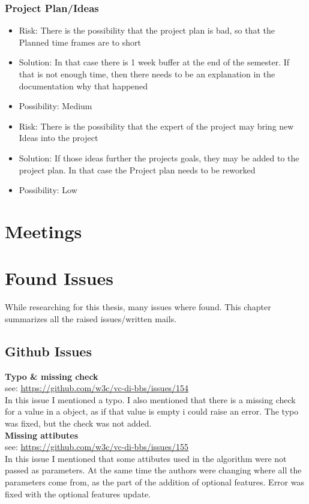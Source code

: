 \documentclass[
	a4paper               %
	,BCOR=0mm            %
	,bibliography=totoc   %
	,listof=totoc         %
	,monolingual
	,twoside=false
]{bfhthesis}              %
\begin{document}
\subsection{Project Plan/Ideas}
\begin{itemize}
	\item Risk: There is the possibility that the project plan is bad, so that the Planned time frames are to short
	\item Solution: In that case there is 1 week buffer at the end of the semester. If that is not enough time, then there needs to be an explanation in the documentation why that happened
	\item Possibility: Medium
\end{itemize}
\begin{itemize}
	\item Risk: There is the possibility that the expert of the project may bring new Ideas into the project
	\item Solution: If those ideas further the projects goals, they may be added to the project plan. In that case the Project plan needs to be reworked
	\item Possibility: Low
\end{itemize}

\chapter{Meetings}

\chapter{Found Issues}

While researching for this thesis, many issues where found. This chapter summarizes all the raised issues/written mails.

\section{Github Issues}

\textbf{Typo \& missing check}\\
see: \url{https://github.com/w3c/vc-di-bbs/issues/154}\\
In this issue I mentioned a typo. I also mentioned that there is a missing check for a value in a object, as if that value is empty i could raise an error.
The typo was fixed, but the check was not added.\\

\noindent
\textbf{Missing attibutes}\\
see: \url{https://github.com/w3c/vc-di-bbs/issues/155}\\
In this issue I mentioned that some attibutes used in the algorithm were not passed as parameters. At the same time the authors were changing where all the parameters come from, as the part of the addition of optional features. Error was fixed with the optional features update.\\
\end{document}
